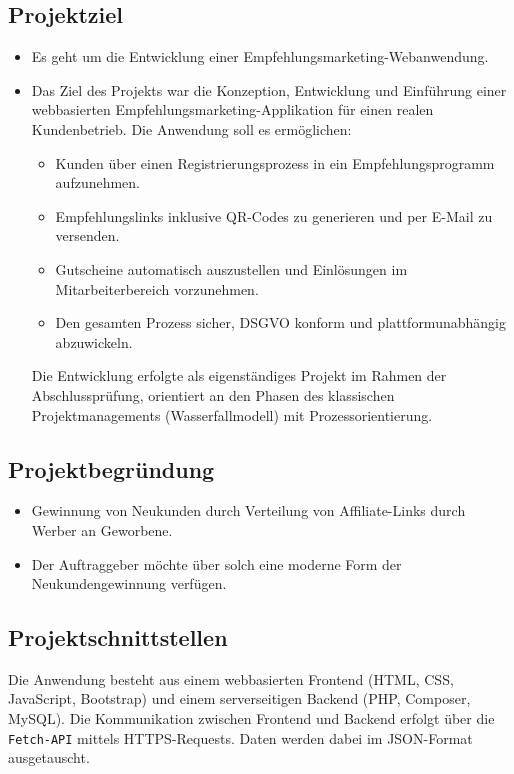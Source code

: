 \subsection{Projektziel} 
\label{sec:Projektziel}
\begin{itemize}
	\item Es geht um die Entwicklung einer Empfehlungsmarketing-Webanwendung.
	\item Das Ziel des Projekts war die Konzeption, Entwicklung und Einführung einer webbasierten Empfehlungsmarketing-Applikation für einen realen Kundenbetrieb.
    Die Anwendung soll es ermöglichen:
    \begin{itemize}
    \item Kunden über einen Registrierungsprozess in ein Empfehlungsprogramm aufzunehmen.
    \item Empfehlungslinks inklusive QR-Codes zu generieren und per E-Mail zu versenden.
    \item Gutscheine automatisch auszustellen und Einlösungen im Mitarbeiterbereich vorzunehmen.
    \item Den gesamten Prozess sicher, \acs{DSGVO} konform und plattformunabhängig abzuwickeln.    
    \end{itemize}
Die Entwicklung erfolgte als eigenständiges Projekt im Rahmen der Abschlussprüfung, orientiert an den Phasen des klassischen Projektmanagements (Wasserfallmodell) mit Prozessorientierung.
\end{itemize}

\subsection{Projektbegründung} 
\label{sec:Projektbegruendung}
\begin{itemize}
	\item Gewinnung von Neukunden durch Verteilung von Affiliate-Links durch Werber an Geworbene.
	\item Der Auftraggeber möchte über solch eine moderne Form der Neukundengewinnung verfügen.
\end{itemize}


\subsection{Projektschnittstellen} 
\label{sec:Projektschnittstellen}
Die Anwendung besteht aus einem webbasierten Frontend (\ac{HTML}, \ac{CSS}, JavaScript, Bootstrap) und einem serverseitigen Backend (\ac{PHP}, \ac{Composer}, \ac{MySQL}).  
Die Kommunikation zwischen Frontend und Backend erfolgt über die \texttt{Fetch-API} mittels \ac{HTTPS}-Requests.  
Daten werden dabei im \ac{JSON}-Format ausgetauscht.  

